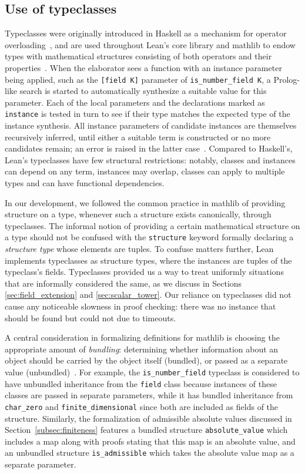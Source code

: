 \documentclass[sn-mathphys]{sn-jnl}%
\newcommand{\lean}[1]{\texttt{#1}\xspace}
\newcommand{\mathlib}{\textsf{mathlib}\xspace}
\begin{document}
\subsection{Use of typeclasses} \label{sec:typeclasses}
Typeclasses were originally introduced in Haskell as a mechanism for operator overloading~\cite{typeclasses-haskell},
and are used throughout Lean's core library and \mathlib to endow types with mathematical structures consisting of both operators and their properties~\cite{mathlib}.
When the elaborator sees a function with an instance parameter being applied, such as the \lean{[field K]} parameter of \lean{is\_number\_field K}, a Prolog-like search is started to automatically synthesize a suitable value for this parameter.
Each of the local parameters and the declarations marked as \lean{instance} is tested in turn to see if their type matches the expected type of the instance synthesis.
All instance parameters of candidate instances are themselves recursively inferred, until either a suitable term is constructed or no more candidates remain; an error is raised in the latter case~\cite[Section 10]{theorem-proving-in-lean}.
Compared to Haskell's, Lean's typeclasses have few structural restrictions: notably, classes and instances can depend on any term, instances may overlap, classes can apply to multiple types and can have functional dependencies.

In our development, we followed the common practice in \mathlib of providing structure on a type,
whenever such a structure exists canonically, through typeclasses.
The informal notion of providing a certain mathematical structure on a type should not be confused with the \lean{structure} keyword formally declaring a \emph{structure type} whose elements are tuples.
To confuse matters further, Lean implements typeclasses as structure types, where the instances are tuples of the typeclass's fields.
Typeclasses provided us a way to treat uniformly situations that are informally considered the same, as we discuss in Sections \ref{sec:field_extension} and \ref{sec:scalar_tower}.
Our reliance on typeclasses did not cause any noticeable slowness in proof checking:
there was no instance that should be found but could not due to timeouts.

A central consideration in formalizing definitions for \mathlib is choosing the appropriate amount of \emph{bundling}:
determining whether information about an object should be carried by the object itself (bundled), or passed as a separate value (unbundled)~\cite{instance-parameters-mathlib}.
For example, the \lean{is\_number\_field} typeclass is considered to have unbundled inheritance from the \lean{field} class because instances of these classes are passed in separate parameters,
while it has bundled inheritance from \lean{char\_zero} and \lean{finite\_dimensional} since both are included as fields of the structure.
Similarly, the formalization of admissible absolute values discussed in Section~\ref{subsec:finiteness} features a bundled structure \lean{absolute\_value} which includes a map along with proofs stating that this map is an absolute value,
and an unbundled structure \lean{is\_admissible} which takes the absolute value map as a separate parameter.
\end{document}
